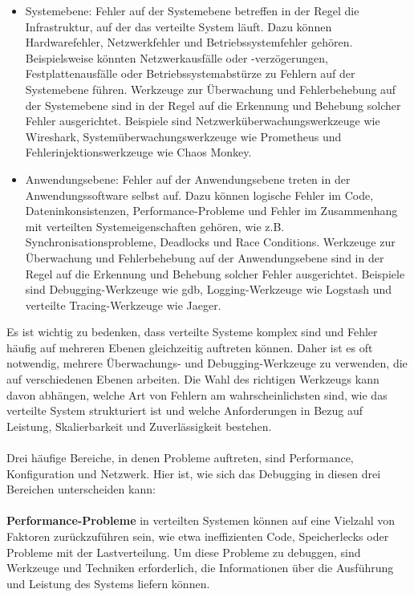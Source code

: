 \begin{itemize}
\item Systemebene: Fehler auf der Systemebene betreffen in der Regel die Infrastruktur, auf der das verteilte System läuft. Dazu können Hardwarefehler, Netzwerkfehler und Betriebssystemfehler gehören. Beispielsweise könnten Netzwerkausfälle oder -verzögerungen, Festplattenausfälle oder Betriebssystemabstürze zu Fehlern auf der Systemebene führen. Werkzeuge zur Überwachung und Fehlerbehebung auf der Systemebene sind in der Regel auf die Erkennung und Behebung solcher Fehler ausgerichtet. Beispiele sind Netzwerküberwachungswerkzeuge wie Wireshark, Systemüberwachungswerkzeuge wie Prometheus und Fehlerinjektionswerkzeuge wie Chaos Monkey.
\item Anwendungsebene: Fehler auf der Anwendungsebene treten in der Anwendungssoftware selbst auf. Dazu können logische Fehler im Code, Dateninkonsistenzen, Performance-Probleme und Fehler im Zusammenhang mit verteilten Systemeigenschaften gehören, wie z.B. Synchronisationsprobleme, Deadlocks und Race Conditions. Werkzeuge zur Überwachung und Fehlerbehebung auf der Anwendungsebene sind in der Regel auf die Erkennung und Behebung solcher Fehler ausgerichtet. Beispiele sind Debugging-Werkzeuge wie gdb, Logging-Werkzeuge wie Logstash und verteilte Tracing-Werkzeuge wie Jaeger.
\end{itemize}
Es ist wichtig zu bedenken, dass verteilte Systeme komplex sind und Fehler häufig auf mehreren Ebenen gleichzeitig auftreten können. Daher ist es oft notwendig, mehrere Überwachungs- und Debugging-Werkzeuge zu verwenden, die auf verschiedenen Ebenen arbeiten. Die Wahl des richtigen Werkzeugs kann davon abhängen, welche Art von Fehlern am wahrscheinlichsten sind, wie das verteilte System strukturiert ist und welche Anforderungen in Bezug auf Leistung, Skalierbarkeit und Zuverlässigkeit bestehen.
\\\\
Drei häufige Bereiche, in denen Probleme auftreten, sind Performance, Konfiguration und Netzwerk. Hier ist, wie sich das Debugging in diesen drei Bereichen unterscheiden kann:
\\\\
\textbf{Performance-Probleme} in verteilten Systemen können auf eine Vielzahl von Faktoren zurückzuführen sein, wie etwa ineffizienten Code, Speicherlecks oder Probleme mit der Lastverteilung. Um diese Probleme zu debuggen, sind Werkzeuge und Techniken erforderlich, die Informationen über die Ausführung und Leistung des Systems liefern können.
